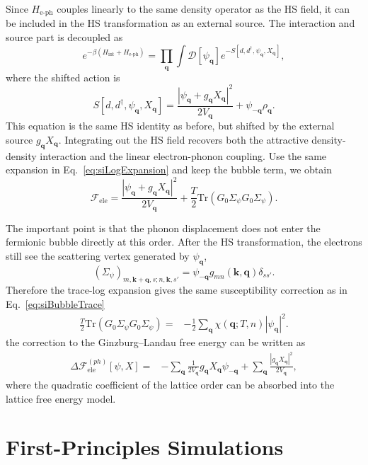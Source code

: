 \documentclass[aps,prx,article,twocolumn,amsmath,amssymb,superscriptaddress,longbibliography]{revtex4-2}
\begin{document}
Since $H_{\mathrm{e\text{-}ph}}$ couples linearly to the same density
operator as the HS field, it can be included in the HS transformation as
an external source.  The interaction and source part is decoupled as
\begin{equation}
e^{-\beta (H_{\mathrm{int}}+H_{\mathrm{e\text{-}ph}})}
=
\prod_{\mathbf q}
\int
\mathcal D[\psi_{\mathbf q}]
e^{-S[d,d^\dagger,\psi_{\mathbf q},X_{\mathbf q}]},
\end{equation}
where the shifted action is
\begin{equation}
S[d,d^\dagger,\psi_{\mathbf q},X_{\mathbf q}]
=
\frac{
\left|
\psi_{\mathbf q}
+
g_{\mathbf q}X_{\mathbf q}
\right|^2
}{
2V_{\mathbf q}
}
+
\psi_{-\mathbf q}\rho_{\mathbf q}.
\end{equation}
This equation is the same HS identity as before, but shifted by the
external source $g_{\mathbf q}X_{\mathbf q}$.  Integrating out the HS
field recovers both the attractive density-density interaction and the
linear electron-phonon coupling.
Use the same expansion in Eq.~\eqref{eq:siLogExpansion} and keep the bubble term, we obtain
\begin{equation}
\label{eq:siQuadraticTrace}
\mathcal F_{\mathrm{ele}}
=
\frac{
\left|
\psi_{\mathbf q}
+
g_{\mathbf q}X_{\mathbf q}
\right|^2
}{
2V_{\mathbf q}
}
+
\frac{T}{2}
\mathrm{Tr}
\left(
G_0\Sigma_\psi
G_0\Sigma_\psi
\right).
\end{equation}

The important point is that the phonon displacement does not enter the
fermionic bubble directly at this order.  After the HS transformation, the
electrons still see the scattering vertex generated by
$\psi_{\mathbf q}$,
\begin{equation}
\left(\Sigma_\psi\right)_{m,\mathbf k+\mathbf q,s;n,\mathbf k,s'}
=
\psi_{-\mathbf q}
g_{mn}(\mathbf k,\mathbf q)
\delta_{ss'} .
\end{equation}
Therefore the trace-log expansion gives the same susceptibility correction
as in Eq.~\eqref{eq:siBubbleTrace}
\begin{align}
\frac{T}{2}
\mathrm{Tr}
\left(
G_0\Sigma_\psi
G_0\Sigma_\psi
\right)
=&
-
\frac{1}{2}
\sum_{\mathbf q}
\chi(\mathbf q;T,n)
|\psi_{\mathbf q}|^2 .
\end{align}
the correction to the Ginzburg--Landau free energy can be written as
\begin{align}
\Delta \mathcal F_{\mathrm{ele}}^{(ph)}[\psi,X]
=
&-
\sum_{\mathbf q}
\frac{1}{2V_{\mathbf q}}
g_{\mathbf q}X_{\mathbf q}\psi_{-\mathbf q}
+
\sum_{\mathbf q}
\frac{|g_{\mathbf q}X_{\mathbf q}|^2}{2V_{\mathbf q}},
\end{align}
where the quadratic coefficient of the lattice order can be absorbed into the lattice free energy model.


\section{First-Principles Simulations}\label{app:DFT}


\end{document}
